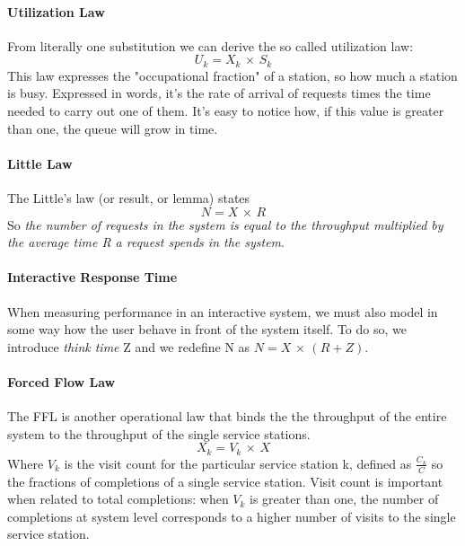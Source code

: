\documentclass{article}
\begin{document}
				\paragraph{Utilization Law}
					From literally one substitution we can derive the so called utilization law:
					\begin{equation}
						U_k = X_k \,\times\, S_k
					\end{equation} 
					This law expresses the "occupational fraction" of a station, so how much a station is busy. Expressed in words, it's the rate of arrival of requests times the time needed to carry out one of them. It's easy to notice how, if this value is greater than one, the queue will grow in time.
					
				\paragraph{Little Law}
					The Little's law (or result, or lemma) states
					\begin{equation}
						N = X \,\times\,R
					\end{equation}
					So \emph{the number of requests in the system is equal to the throughput multiplied by the average time R a request spends in the system}.
					
				\paragraph{Interactive Response Time}
					When measuring performance in an interactive system, we must also model in some way how the user behave in front of the system itself. To do so, we introduce \emph{think time} Z and we redefine N as $N = X \,\times\, (R + Z) $.

				\paragraph{Forced Flow Law}
					The FFL is another operational law that binds the the throughput of the entire system to the throughput of the single service stations.
					\begin{equation}
						X_k = V_k \,\times\, X
					\end{equation}
					Where $V_k$ is the visit count for the particular service station k, defined as $\frac{C_k}{C}$ so the fractions of completions of a single service station. Visit count is important when related to total completions: when $V_k$ is greater than one, the number of completions at system level corresponds to a higher number of visits to the single service station.\\
					
\end{document}
